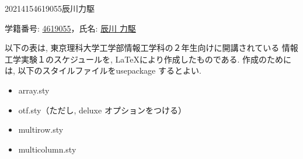 \documentclass[12pt]{jarticle}
\begin{document}
{2021}{4}{15}{4619055}{辰川力駆}

\begin{center}
    学籍番号: \underline{4619055}，氏名: \underline{辰川 力駆}
\end{center}

以下の表は, 東京理科大学工学部情報工学科の２年生向けに開講されている
情報工学実験１のスケジュールを, \LaTeX により作成したものである.
作成のためには, 以下のスタイルファイルをusepackage するとよい.

\begin{itemize}
    \item array.sty
    \item otf.sty（ただし, deluxe オプションをつける）
    \item multirow.sty
    \item multicolumn.sty
\end{itemize}
\end{document}

